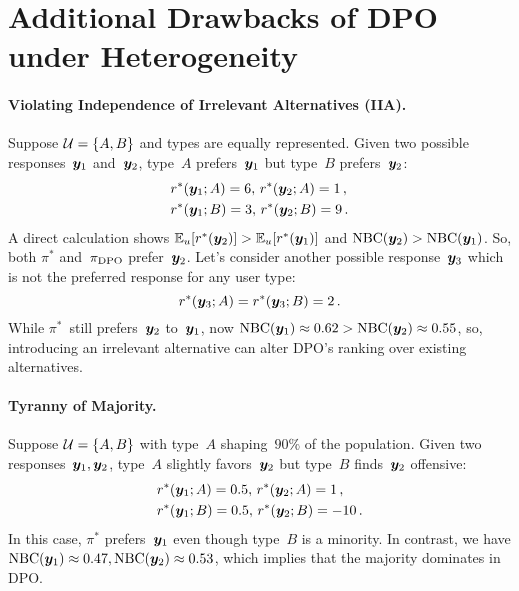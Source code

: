 \section{Additional Drawbacks of DPO under Heterogeneity}
\label{sec:drawbacks_appendix}

\paragraph{Violating Independence of Irrelevant Alternatives (IIA).}
Suppose ${\mathcal{U}} = \{A, B\}$ and types are equally represented. Given two possible responses~${\bm{y}}_1$ and~${\bm{y}}_2$, type~$A$ prefers~${\bm{y}}_1$ but type~$B$ prefers~${\bm{y}}_2$:
%
\begin{align*}
    &r^*({\bm{y}}_1; A) = 6,\, r^*({\bm{y}}_2; A) = 1 \,, \\
    &r^*({\bm{y}}_1; B) = 3,\, r^*({\bm{y}}_2; B) = 9 \,.
\end{align*}
%
A direct calculation shows $\mathbb{E}_u[r^*({\bm{y}}_2)] > \mathbb{E}_u[r^*({\bm{y}}_1)]$ and ${\rm NBC}({\bm{y}}_2) > {\rm NBC}({\bm{y}}_1)$. So, both $\pi^*$ and~$\pi_{\rm DPO}$ prefer~${\bm{y}}_2$. Let's consider another possible response~${\bm{y}}_3$ which is not the preferred response for any user type:
%
\begin{equation*}
    r^*({\bm{y}}_3; A) = r^*({\bm{y}}_3; B) = 2 
    \,.
\end{equation*}
%
While $\pi^*$~still prefers~${\bm{y}}_2$ to~${\bm{y}}_1$, now ${\rm NBC}({\bm{y}}_1) \approx 0.62 > {\rm NBC}({\bm{y}}_2) \approx 0.55$, so, introducing an irrelevant alternative can alter DPO's ranking over existing alternatives.


\paragraph{Tyranny of Majority.}
Suppose ${\mathcal{U}} = \{A, B\}$ with type~$A$ shaping~$90\%$ of the population. Given two responses~${\bm{y}}_1, {\bm{y}}_2$, type~$A$ slightly favors~${\bm{y}}_2$ but type~$B$ finds~${\bm{y}}_2$ offensive:
%
\begin{align*}
    &r^*({\bm{y}}_1; A) = 0.5,\, r^*({\bm{y}}_2; A) = 1 \,, \\
    &r^*({\bm{y}}_1; B) = 0.5,\, r^*({\bm{y}}_2; B) = -10 \,.
\end{align*}
%
In this case, $\pi^*$ prefers~${\bm{y}}_1$ even though type~$B$ is a minority. In contrast, we have ${\rm NBC}({\bm{y}}_1) \approx 0.47, {\rm NBC}({\bm{y}}_2) \approx 0.53$, which implies that the majority dominates in DPO.






